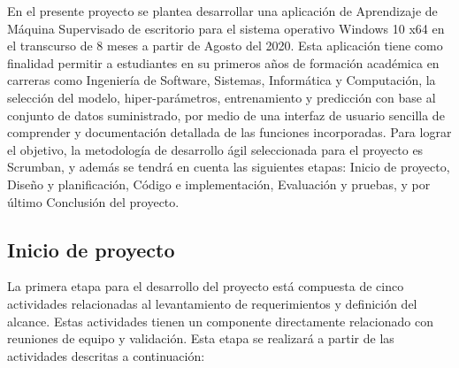En el presente proyecto se plantea desarrollar una aplicación de Aprendizaje de Máquina Supervisado de escritorio para el sistema operativo Windows 10 x64 en el transcurso de 8 meses a partir de Agosto del 2020. Esta aplicación tiene como finalidad permitir a estudiantes en su primeros años de formación académica en carreras como Ingeniería de Software, Sistemas, Informática y Computación, la selección del modelo, hiper-parámetros, entrenamiento y predicción con base al conjunto de datos suministrado, por medio de una interfaz de usuario sencilla de comprender y documentación detallada de las funciones incorporadas. Para lograr el objetivo, la metodología de desarrollo ágil seleccionada para el proyecto es Scrumban, y además se tendrá en cuenta las siguientes etapas: Inicio de proyecto, Diseño y planificación, Código e implementación, Evaluación y pruebas, y por último Conclusión del proyecto.

\subsection{Inicio de proyecto}
La primera etapa para el desarrollo del proyecto está compuesta de cinco actividades relacionadas al levantamiento de requerimientos y definición del alcance. Estas actividades tienen un componente directamente relacionado con reuniones de equipo y validación. Esta etapa se realizará a partir de las actividades descritas a continuación:

